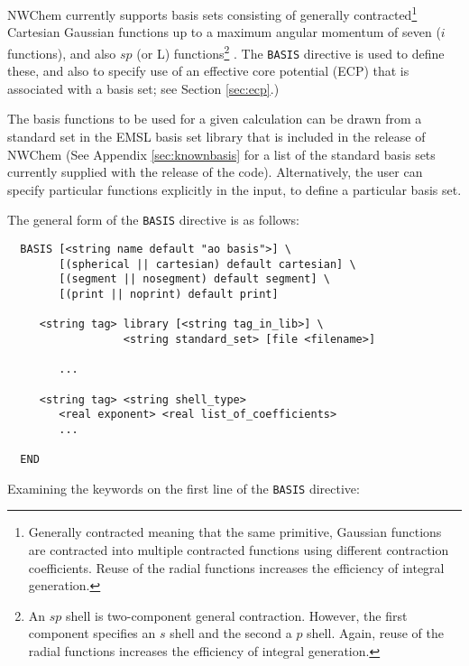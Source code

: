 \label{sec:basis} 

NWChem currently supports basis sets consisting of generally
contracted\footnote{Generally contracted meaning that the same
  primitive, Gaussian functions are contracted into multiple
  contracted functions using different contraction coefficients.
  Reuse of the radial functions increases the efficiency of integral
  generation.} Cartesian Gaussian functions up to a maximum angular
momentum of seven ($i$ functions), and also $sp$ (or L)
functions\footnote{An $sp$ shell is two-component general contraction.
  However, the first component specifies an $s$ shell and the second a
  $p$ shell.  Again, reuse of the radial functions increases the efficiency
  of integral generation.} .  The {\tt BASIS} directive is used to
define these, and also to specify use of an effective core potential
(ECP) that is associated with a basis set; see Section \ref{sec:ecp}.)

The basis functions to be used for a given calculation can be drawn
from a standard set in the EMSL basis set library that is included in
the release of NWChem  (See Appendix \ref{sec:knownbasis} for a list
of the standard basis sets currently supplied with the release of the
code).  Alternatively, the user can specify particular functions
explicitly in the input, to define a particular basis set.

The general form of the \verb+BASIS+ directive is as follows:

\begin{verbatim}
  BASIS [<string name default "ao basis">] \
        [(spherical || cartesian) default cartesian] \
        [(segment || nosegment) default segment] \
        [(print || noprint) default print]

     <string tag> library [<string tag_in_lib>] \
                  <string standard_set> [file <filename>]

        ...

     <string tag> <string shell_type>
        <real exponent> <real list_of_coefficients>
        ...
     
  END
\end{verbatim}    

Examining the keywords on the first line of the \verb+BASIS+ directive:


